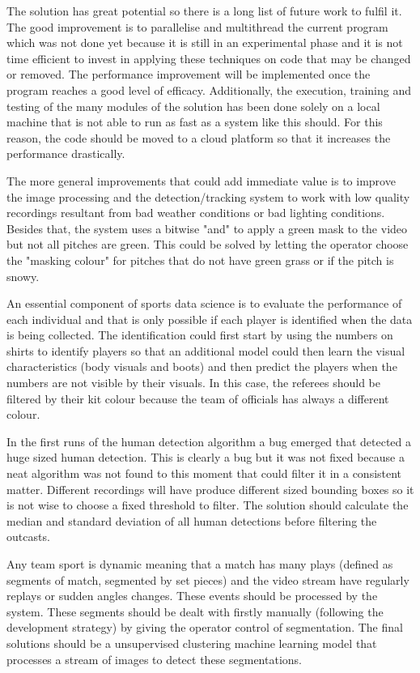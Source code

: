 \documentclass[
    11pt,
    twoside
]{report}
\begin{document}
The solution has great potential so there is a long list of future work to fulfil it. The good improvement is to parallelise and multithread the current program which was not done yet because it is still in an experimental phase and it is not time efficient to invest in applying these techniques on code that may be changed or removed. The performance improvement will be implemented once the program reaches a good level of efficacy. Additionally, the execution, training and testing of the many modules of the solution has been done solely on a local machine that is not able to run as fast as a system like this should. For this reason, the code should be moved to a cloud platform so that it increases the performance drastically.


The more general improvements that could add immediate value is to improve the image processing and the detection/tracking system to work with low quality recordings resultant from bad weather conditions or bad lighting conditions. Besides that, the system uses a bitwise "and" to apply a green mask to the video but not all pitches are green. This could be solved by letting the operator choose the "masking colour" for pitches that do not have green grass or if the pitch is snowy.


An essential component of sports data science is to evaluate the performance of each individual and that is only possible if each player is identified when the data is being collected. The identification could first start by using the numbers on shirts to identify players so that an additional model could then learn the visual characteristics (body visuals and boots) and then predict the players when the numbers are not visible by their visuals. In this case, the referees should be filtered by their kit colour because the team of officials has always a different colour.


In the first runs of the human detection algorithm a bug emerged that detected a huge sized human detection. This is clearly a bug but it was not fixed because a neat algorithm was not found to this moment that could filter it in a consistent matter. Different recordings will have produce different sized bounding boxes so it is not wise to choose a fixed threshold to filter. The solution should calculate the median and standard deviation of all human detections before filtering the outcasts.


Any team sport is dynamic meaning that a match has many plays (defined as segments of match, segmented by set pieces) and the video stream have regularly replays or sudden angles changes. These events should be processed by the system. These segments should be dealt with firstly manually (following the development strategy) by giving the operator control of segmentation. The final solutions should be a unsupervised clustering machine learning model that processes a stream of images to detect these segmentations.
\end{document}
